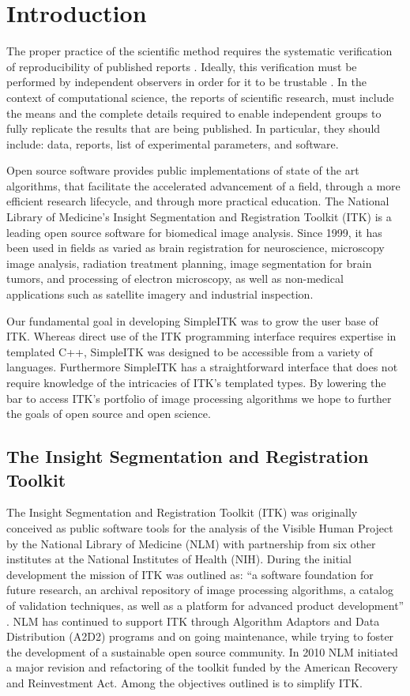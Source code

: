 \documentclass{frontiersMED} %
\begin{document}
\section{Introduction}
The proper practice of the scientific method requires the systematic
verification of reproducibility of published reports
\cite{Popper1934}. Ideally, this verification must be performed by
independent observers in order for it to be trustable \cite{Popper1968}. In
the context of computational science, the reports of scientific
research, must include the means and the complete details required to
enable independent groups to fully replicate the results that are
being published. In particular, they should include: data, reports,
list of experimental parameters, and software.

Open source software provides public implementations of state of the
art algorithms, that facilitate the accelerated advancement of a
field, through a more efficient research lifecycle, and through more
practical education. The National Library of Medicine's Insight
Segmentation and Registration Toolkit (ITK) is a leading open source
software for biomedical image analysis. Since 1999, it has been used
in fields as varied as brain registration for neuroscience, microscopy
image analysis, radiation treatment planning, image segmentation for
brain tumors, and processing of electron microscopy, as well as
non-medical applications such as satellite imagery and industrial
inspection.

Our fundamental goal in developing SimpleITK was to grow the user base
of ITK.  Whereas direct use of the ITK programming interface requires
expertise in templated C++, SimpleITK was designed to be accessible
from a variety of languages.  Furthermore SimpleITK has a
straightforward interface that does not require knowledge of the
intricacies of ITK's templated types. By lowering the bar to access
ITK's portfolio of image processing algorithms we hope to further the
goals of open source and open science.

\subsection{The Insight Segmentation and Registration Toolkit}

The Insight Segmentation and Registration Toolkit (ITK) was originally
conceived as public software tools for the analysis of the Visible
Human Project by the National Library of Medicine (NLM) with
partnership from six other institutes at the National Institutes of
Health (NIH). During the initial development the mission of ITK was
outlined as: “a software foundation for future research, an archival
repository of image processing algorithms, a catalog of validation
techniques, as well as a platform for advanced product development”
\cite{Yoo2002}. NLM has continued to support ITK through Algorithm Adaptors
and Data Distribution (A2D2) programs and on going maintenance, while
trying to foster the development of a sustainable open source
community. In 2010 NLM initiated a major revision and refactoring of
the toolkit funded by the American Recovery and Reinvestment
Act. Among the objectives outlined is to simplify ITK.
\end{document}

